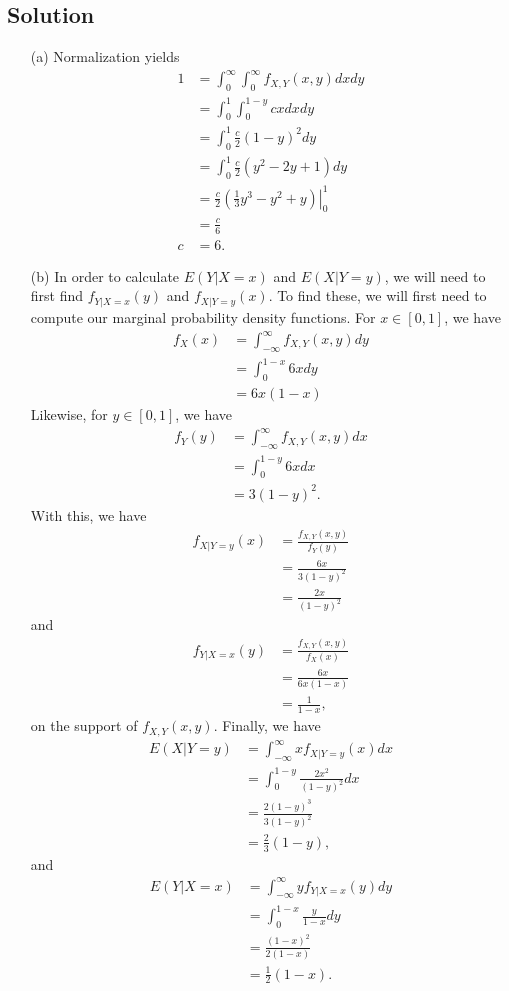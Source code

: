 \documentclass[10pt,a4paper]{article}
\theoremstyle{theorem}
\theoremstyle{definition}
\begin{document}
\subsection*{Solution}
\begin{enumerate}
\item[(a)] Normalization yields
\begin{align*}
1 &= \int_0^\infty \int_0^\infty f_{X, Y}(x, y) dx dy\\
&= \int_0^1 \int_0^{1 - y}  cx dx dy\\
&= \int_0^1 \frac{c}{2}(1 - y)^2 dy\\
&= \int_0^1 \frac{c}{2}(y^2 - 2y + 1) dy\\
&= \left. \frac{c}{2}(\frac{1}{3}y^3 - y^2 + y) \right|_0^1\\
&= \frac{c}{6}\\
c &= \boxed{6}.
\end{align*}
\item[(b)] In order to calculate $E(Y | X = x)$ and $E(X| Y = y)$, we will need to first find $f_{Y | X = x}(y)$ and $f_{X | Y = y}(x)$. To find these, we will first need to compute our marginal probability density functions. For $x \in [0, 1]$, we have
\begin{align*}
f_X(x) &= \int_{-\infty}^{\infty} f_{X, Y}(x, y) dy\\
&= \int_{0}^{1 - x} 6x dy\\
&=  6x(1 - x)
\end{align*}
Likewise, for $y \in [0, 1]$, we have
\begin{align*}
f_Y(y) &= \int_{-\infty}^{\infty} f_{X, Y}(x, y) dx\\
&= \int_{0}^{1 - y} 6x dx\\
&= 3(1 - y)^2.
\end{align*}
With this, we have
\begin{align*}
f_{X | Y = y}(x) &= \frac{f_{X, Y}(x, y)}{f_Y(y)}\\
&= \frac{6x}{3(1 - y)^2}\\
&= \frac{2x}{(1 - y)^2}
\end{align*}
and 
\begin{align*}
f_{Y | X = x}(y) &= \frac{f_{X, Y}(x, y)}{f_X(x)}\\
&= \frac{6x}{6x(1 - x)}\\
&= \frac{1}{1 - x},
\end{align*}
on the support of $f_{X, Y}(x, y)$. Finally, we have
\begin{align*}
E(X| Y = y) &= \int_{-\infty}^\infty xf_{X | Y = y}(x) dx\\
&= \int_{0}^{1 - y} \frac{2x^2}{(1 - y)^2} dx\\
&= \frac{2(1 - y)^3}{3(1 - y)^2}\\
&= \boxed{\frac{2}{3}(1 - y)},
\end{align*}
and 
\begin{align*}
E(Y| X = x) &= \int_{-\infty}^\infty yf_{Y | X = x}(y) dy\\
&= \int_{0}^{1 - x} \frac{y}{1 - x} dy\\
&= \frac{(1 - x)^2}{2(1 - x)}\\
&= \boxed{\frac{1}{2} (1 - x)}.
\end{align*}
\end{enumerate}
\end{document}
